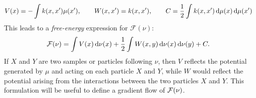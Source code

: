 \begin{align}\label{eq:potentials}
V(x)=-\int  k(x,x')\mu(x'), \qquad
W(x,x')=k(x,x'), \qquad
C = \frac{1}{2} \int k(x,x')\mathop{}\!\mathrm{d}\mu(x) \mathop{}\!\mathrm{d}\mu(x') 
\end{align}
This leads to a \textit{free-energy} expression for $\mathcal{F}(\nu)$:
\begin{align}\label{eq:mmd_as_free_energy}
	{{\mathcal F}}(\nu) = \int V(x) \mathop{}\!\mathrm{d} \nu(x) +\frac{1}{2} \int W(x,y)\mathop{}\!\mathrm{d} \nu(x)\mathop{}\!\mathrm{d} \nu(y) + C.
\end{align}
If $X$ and $Y$ are two samples or particles following $\nu$, then $V$ reflects the potential generated by $\mu$ and acting on each particle $X$ and $Y$, while $W$ would reflect the potential arising from the interactions between the two particles $X$ and $Y$. This formulation will be useful to define a gradient flow of ${{\mathcal F}}(\nu)$. %
